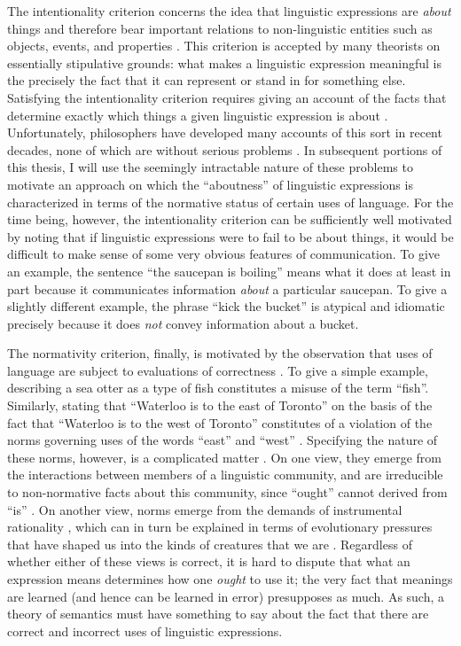 The intentionality criterion concerns the idea that linguistic expressions are \textit{about} things and therefore bear important relations to non-linguistic entities such as objects, events, and properties \citep{Speaks:2014,Stanley:2008}. This criterion is accepted by many theorists on essentially stipulative grounds: what makes a linguistic expression meaningful is the precisely the fact that it can represent or stand in for something else. Satisfying the intentionality criterion requires giving an account of the facts that determine exactly which things a given linguistic expression is about \citep{Horwich:1998,Brandom:2000}. Unfortunately, philosophers have developed many accounts of this sort in recent decades, none of which are without serious problems \citep{Horwich:1998,Horwich:2005}. In subsequent portions of this thesis, I will use the seemingly intractable nature of these problems to motivate an approach on which the ``aboutness'' of linguistic expressions is characterized in terms of the normative status of certain uses of language. For the time being, however, the intentionality criterion can be sufficiently well motivated by noting that if linguistic expressions were to fail to be about things, it would be difficult to make sense of some very obvious features of communication. To give an example, the sentence ``the saucepan is boiling'' means what it does at least in part because it communicates information \textit{about} a particular saucepan. To give a slightly different example, the phrase ``kick the bucket'' is atypical and idiomatic precisely because it does \textit{not} convey information about a bucket.
 
The normativity criterion, finally, is motivated by the observation that uses of language are subject to evaluations of correctness \citep{Wittgenstein:1953,Brandom:1994,Brandom:2000,Brandom:2009,Sellars:1953,Kripke:1982}. To give a simple example, describing a sea otter as a type of fish constitutes a misuse of the term ``fish''. Similarly, stating that ``Waterloo is to the east of Toronto'' on the basis of the fact that ``Waterloo is to the west of Toronto'' constitutes of a violation of the norms governing uses of the words ``east'' and ``west'' \citep[i.e., they are not synonyms; see][p. 98]{Brandom:1994}. Specifying the nature of these norms, however, is a complicated matter \citep{Brandom:1994,Kripke:1982}. On one view, they emerge from the interactions between members of a linguistic community, and are irreducible to non-normative facts about this community, since ``ought'' cannot derived from ``is'' \citep{Brandom:1994}. On another view, norms emerge from the demands of instrumental rationality \citep{Horwich:1998}, which can in turn be explained in terms of evolutionary pressures that have shaped us into the kinds of creatures that we are \citep{Dennett:1987,Dennett:2010}. Regardless of whether either of these views is correct, it is hard to dispute that what an expression means determines how one \textit{ought} to use it; the very fact that meanings are learned (and hence can be learned in error) presupposes as much. As such, a theory of semantics must have something to say about the fact that there are correct and incorrect uses of linguistic expressions.


